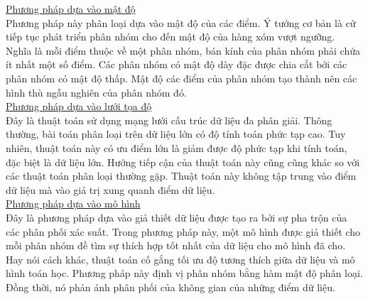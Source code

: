 \clearpage

\underline{Phương pháp dựa vào mật độ}\\
\hspace*{10mm}Phương pháp này phân loại dựa vào mật độ của các điểm. Ý tưởng cơ bản là cứ tiếp tục phát triển phân nhóm cho đến mật độ của hàng xóm vượt ngưỡng. Nghĩa là mỗi điểm thuộc về một phân nhóm, bán kính của phân nhóm phải chứa ít nhất một số điểm. Các phân nhóm có mật độ dày đặc được chia cắt bởi các phân nhóm có mật độ thấp. Mật độ các điểm của phân nhóm tạo thành nên các hình thù ngẫu nghiên của phân nhóm đó.\\

\underline{Phương pháp dựa vào lưới tọa độ}\\
\hspace*{10mm}Đây là thuật toán sử dụng mạng lưới cấu trúc dữ liệu đa phân giải. Thông thường, bài toán phân loại trên dữ liệu lớn có độ tính toán phức tạp cao. Tuy nhiên, thuật toán này có ưu điểm lớn là giảm được độ phức tạp khi tính toán, đặc biệt là dữ liệu lớn. Hướng tiếp cận của thuật toán này cũng cũng khác so với các thuật toán phân loại thường gặp. Thuật toán này không tập trung vào điểm dữ liệu mà vào giá trị xung quanh điểm dữ liệu. \\

\underline{Phương pháp dựa vào mô hình}\\
\hspace*{10mm} Đây là phương pháp dựa vào giả thiết dữ liệu được tạo ra bởi sự pha trộn của các phân phối xác suất. Trong phương pháp này, một mô hình được giả thiết cho mỗi phân nhóm đề tìm sự thích hợp tốt nhất của dữ liệu cho mô hình đã cho. Hay nói cách khác, thuật toán cố gắng tối ưu độ tương thích giữa dữ liệu và mô hình toán học. Phương pháp này định vị phân nhóm bằng hàm mật độ phân loại. Đồng thời, nó phản ánh phân phối của không gian của những điểm dữ liệu.\\

